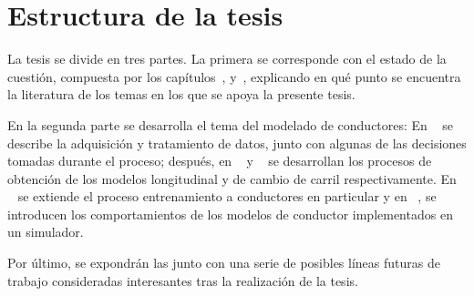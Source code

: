 \section{Estructura de la tesis}
\label{ch:intro:structure}


La tesis se divide en tres partes. La primera se corresponde con el estado de la cuestión, compuesta por los capítulos~,  y~, explicando en qué punto se encuentra la literatura de los temas en los que se apoya la presente tesis.

En la segunda parte se desarrolla el tema del modelado de conductores: En ~ se describe la adquisición y tratamiento de datos, junto con algunas de las decisiones tomadas durante el proceso; después, en ~ y ~ se desarrollan los procesos de obtención de los modelos longitudinal y de cambio de carril respectivamente. En ~ se extiende el proceso entrenamiento a conductores en particular y en ~, se introducen los comportamientos de los modelos de conductor implementados en un simulador.

Por último, se expondrán las  junto con una serie de posibles líneas futuras de trabajo consideradas interesantes tras la realización de la tesis.
